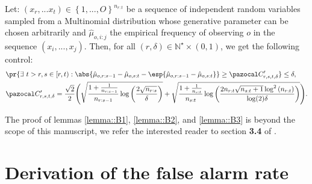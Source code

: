 \documentclass{article} %
\begin{document}
\begin{lemma}
	Let: $\left(x_{r},...x_t\right) \in \left\lbrace 1,..., O \right\rbrace^{n_{r:t}}$  be a sequence of independent  random variables sampled from a Multinomial distribution whose generative parameter can be chosen arbitrarily and $\hat{\mu}_{o,i:j}$ the empirical frequency of observing $o$ in the sequence $\left(x_i,...,x_j\right)$. Then, for all $\left(r,\delta\right) \in \mathbb{N}^\star \times \left(0,1 \right)$, we get the following control:
	\begin{align*}
	& \pr{ \exists\ t > r,  s \in \left[r, t\right): \abs{ \hat{\mu}_{o,r:s-1}-\hat{\mu}_{o,s:t}- \esp{\hat{\mu}_{o,r:s-1}-\hat{\mu}_{o,s:t}}} \geq  \pC^\prime_{r,s,t,\delta}} \leq \delta, \\
  &\pC^\prime_{r,s,t,\delta} = \frac{\sqrt{2}}{2} \Bigg( \sqrt{\frac{1+\frac{1}{n_{r:s-1}}}{n_{r:s-1}} \log \left(\frac{2\sqrt{n_{r:s}}}{\delta}\right)}  +\sqrt{\frac{1+\frac{1}{n_{s:t}}}{n_{s:t}} \log \left(\frac{2n_{r:t} \sqrt{n_{s:t}+1} \log^{2}\left(n_{r:t}\right)}{\log(2) \delta}\right)}\Bigg).
	\end{align*}
	\label{lemma::B3}
\end{lemma}

The proof of lemmas \ref{lemma::B1}, \ref{lemma::B2}, and \ref{lemma::B3} is beyond the scope of this manuscript, we refer the interested reader to section \textbf{3.4} of \cite{maillard2019mathematics}.

\section{Derivation of the false alarm rate}
\end{document}
